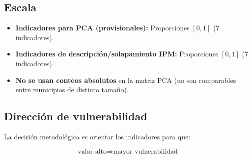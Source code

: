 \subsection{Escala}
\label{sec:escala}

\begin{itemize}
    \item \textbf{Indicadores para PCA (provisionales):} Proporciones $[0,1]$ (7 indicadores).
    \item \textbf{Indicadores de descripción/solapamiento IPM:} Proporciones $[0,1]$ (7 indicadores).
    \item \textbf{No se usan conteos absolutos} en la matriz PCA (no son comparables entre municipios de distinto tamaño).
\end{itemize}

\subsection{Dirección de vulnerabilidad}
\label{sec:direccion_vulnerabilidad}

La decisión metodológica es orientar los indicadores para que:

\begin{equation}
\text{valor alto} \Rightarrow \text{mayor vulnerabilidad}
\end{equation}

